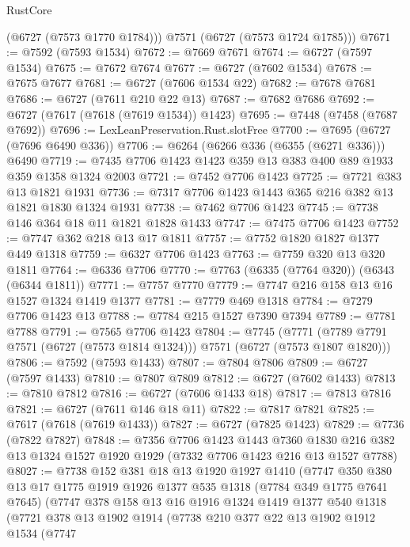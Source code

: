 \begin{lexlean}{RustCore}
\begin{coremodule}
        (@6727 (@7573 @1770 @1784)))
      @7571
      (@6727 (@7573 @1724 @1785)))
@7671 := @7592 (@7593 @1534)
@7672 := @7669 @7671
@7674 := @6727 (@7597 @1534)
@7675 := @7672 @7674
@7677 := @6727 (@7602 @1534)
@7678 := @7675 @7677
@7681 := @6727 (@7606 @1534 @22)
@7682 := @7678 @7681
@7686 := @6727 (@7611 @210 @22 @13)
@7687 := @7682 @7686
@7692 := @6727 (@7617 (@7618 (@7619 @1534)) @1423)
@7695 := @7448 (@7458 (@7687 @7692))
@7696 := LexLeanPreservation.Rust.slotFree
@7700 := @7695 (@6727 (@7696 @6490 @336))
@7706 := @6264 (@6266 @336 (@6355 (@6271 @336))) @6490
@7719 := @7435 @7706 @1423 @1423 @359 @13 @383 @400 @89 @1933 @359 @1358 @1324 @2003
@7721 := @7452 @7706 @1423
@7725 := @7721 @383 @13 @1821 @1931
@7736 := @7317 @7706 @1423 @1443 @365 @216 @382 @13 @1821 @1830 @1324 @1931
@7738 := @7462 @7706 @1423
@7745 := @7738 @146 @364 @18 @11 @1821 @1828 @1433
@7747 := @7475 @7706 @1423
@7752 := @7747 @362 @218 @13 @17 @1811
@7757 := @7752 @1820 @1827 @1377 @449 @1318
@7759 := @6327 @7706 @1423
@7763 := @7759 @320 @13 @320 @1811
@7764 := @6336 @7706
@7770 := @7763 (@6335 (@7764 @320)) (@6343 (@6344 @1811))
@7771 := @7757 @7770
@7779 := @7747 @216 @158 @13 @16 @1527 @1324 @1419 @1377
@7781 := @7779 @469 @1318
@7784 := @7279 @7706 @1423 @13
@7788 := @7784 @215 @1527 @7390 @7394
@7789 := @7781 @7788
@7791 := @7565 @7706 @1423
@7804 := @7745
    (@7771 (@7789 @7791 @7571 (@6727 (@7573 @1814 @1324))) @7571 (@6727 (@7573 @1807 @1820)))
@7806 := @7592 (@7593 @1433)
@7807 := @7804 @7806
@7809 := @6727 (@7597 @1433)
@7810 := @7807 @7809
@7812 := @6727 (@7602 @1433)
@7813 := @7810 @7812
@7816 := @6727 (@7606 @1433 @18)
@7817 := @7813 @7816
@7821 := @6727 (@7611 @146 @18 @11)
@7822 := @7817 @7821
@7825 := @7617 (@7618 (@7619 @1433))
@7827 := @6727 (@7825 @1423)
@7829 := @7736 (@7822 @7827)
@7848 := @7356
    @7706
    @1423
    @1443
    @7360
    @1830
    @216
    @382
    @13
    @1324
    @1527
    @1920
    @1929
    (@7332 @7706 @1423 @216 @13 @1527 @7788)
@8027 := @7738
    @152
    @381
    @18
    @13
    @1920
    @1927
    @1410
    (@7747
      @350
      @380
      @13
      @17
      @1775
      @1919
      @1926
      @1377
      @535
      @1318
      (@7784 @349 @1775 @7641 @7645)
      (@7747
        @378
        @158
        @13
        @16
        @1916
        @1324
        @1419
        @1377
        @540
        @1318
        (@7721
          @378
          @13
          @1902
          @1914
          (@7738
            @210
            @377
            @22
            @13
            @1902
            @1912
            @1534
            (@7747

\end{coremodule}
\end{lexlean}
